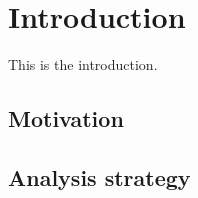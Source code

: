 \section{Introduction}\label{sec:intro}

This is the introduction.

\subsection{Motivation}


\subsection{Analysis strategy}



